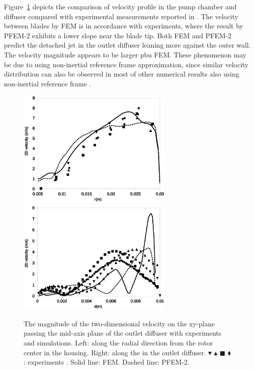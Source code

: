 Figure~\ref{fig:pumpvelprofile} depicts the comparison of velocity profile in the pump chamber and diffuser compared with experimental measurements reported in \cite{mali_cfd}. The velocity between blades by FEM is in accordance with experiments, where the result by PFEM-2 exhibits a lower slope near the blade tip. Both FEM and PFEM-2 predict the detached jet in the outlet diffuser leaning more against the outer wall. The velocity magnitude appears to be larger pbu FEM. These phenomenon may be due to using non-inertial reference frame approximation, since similar velocity distribution can also be observed in most of other numerical results also using non-inertial reference frame \cite{mali_cfd}. 
 
\begin{figure}[htbp]
    \centering
    \includegraphics[width=3in]{imgs/nozzle_pump/pump_velblade.eps}\\
    \vspace{.5cm}
    \includegraphics[width=3in]{imgs/nozzle_pump/pump_veldiffuser.eps}
    \caption{The magnitude of the two-dimensional velocity on the xy-plane passing the mid-axis plane of the outlet diffuser with experiments and simulations. Left: along the radial direction from the rotor center in the housing. Right: along the in the outlet diffuser. $\blacktriangledown$ $\blacktriangle$ $\blacksquare$ $\blacklozenge$: experiments \cite{mali_cfd}. Solid line: FEM. Dashed line: PFEM-2. }
    \label{fig:pumpvelprofile}
\end{figure}